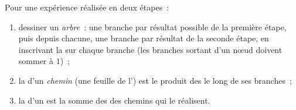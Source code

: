 \begin{method}\label{met:g10:proba:tree}
Pour une expérience réalisée en deux étapes~:
\begin{enumerate}
  \item dessiner un \emph{arbre}~: une
        branche par résultat possible de la première étape, puis depuis
        chacune, une branche par résultat de la seconde étape, en
        inscrivant la  sur chaque branche (les branches
        sortant d'un nœud doivent sommer à $1$)~;
  \item la  d'un \emph{chemin} (une feuille de l') est le
        produit des  le long de ses branches~;
  \item la  d'un  est la somme des  des
        chemins qui le réalisent.
\end{enumerate}
\end{method}

